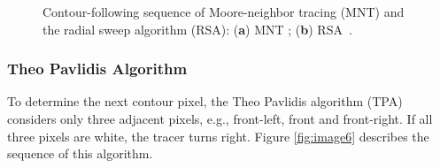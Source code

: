 \documentclass[sensors,article,accept,moreauthors,pdftex,10pt,a4paper]{mdpi}
\begin{document}
\begin{figure}[H]
	\centering
	\caption{Contour-following sequence of Moore-neighbor tracing (MNT) and the radial sweep algorithm (RSA): (\textbf{a}) MNT \cite{Toussaint????Grids}; (\textbf{b}) RSA~\cite{Reddy2012Evaluation}.}
	\label{fig:mnt_rsa}
\end{figure}


\subsubsection{Theo Pavlidis Algorithm}
To determine the next contour pixel, the Theo Pavlidis algorithm (TPA) \cite{Pavlidis2012Algorithms} considers only three adjacent pixels, e.g., front-left, front and front-right. If all three pixels are white, the tracer turns right. Figure \ref{fig:image6} describes the sequence of this algorithm. 
\end{document}
